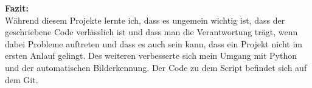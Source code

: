 \noindent
\textbf{Fazit:}
\\ 

\noindent
Während diesem Projekte lernte ich, dass es ungemein wichtig ist, dass der geschriebene Code verlässlich ist und dass man die Verantwortung trägt, wenn dabei Probleme auftreten und dass es auch sein kann, dass ein Projekt nicht im ersten Anlauf gelingt. Des weiteren verbesserte sich mein Umgang mit Python und der automatischen Bilderkennung. Der Code zu dem Script befindet sich auf dem Git.





